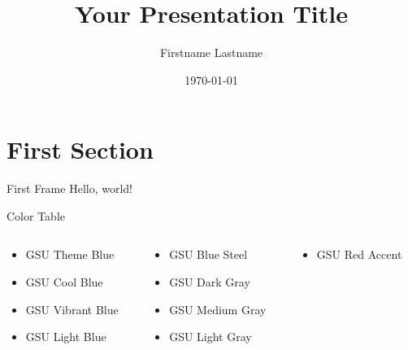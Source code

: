 \documentclass{beamer}
\title[Short title]{Your Presentation Title}
\date{\today}
\author[F. L.]{Firstname Lastname}
\institute[GSU]{Georgia State University}
\begin{document}
	\begin{frame}
		\titlepage
	\end{frame}
	\begin{frame}
		\tableofcontents
	\end{frame}

	\section{First Section}
	\begin{frame}{First Frame}
		Hello, world!
	\end{frame}
	\begin{frame}{Color Table}
		
		\begin{columns}
			\begin{column}{0.33\textwidth}
				\begin{itemize}
					\item \textcolor{GSUThemeBlue}{GSU Theme Blue}
					\item \textcolor{GSUCoolBlue}{GSU Cool Blue}
					\item \textcolor{GSUVibrantBlue}{GSU Vibrant Blue}
					\item \textcolor{GSULightBlue}{GSU Light Blue}
				\end{itemize}
			\end{column}
			
			\begin{column}{0.33\textwidth}
				\begin{itemize}
					\item \textcolor{GSUBlueSteel}{GSU Blue Steel}
					\item \textcolor{GSUDarkGray}{GSU Dark Gray}
					\item \textcolor{GSUMediumGray}{GSU Medium Gray}
					\item \textcolor{GSULightGray}{GSU Light Gray}
				\end{itemize}
			\end{column}
		
			\begin{column}{0.33\textwidth}
				\begin{itemize}
					\item \textcolor{GSURedAccent}{GSU Red Accent}
				\end{itemize}
			\end{column}
		\end{columns}
		
	\end{frame}
	
\end{document}
